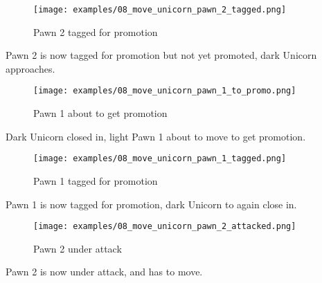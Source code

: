 \clearpage %

\noindent
\begin{figure}[h]
\texttt{[image: examples/08\_move\_unicorn\_pawn\_2\_tagged.png]}
\caption{Pawn 2 tagged for promotion}
\label{fig:08_move_unicorn_pawn_2_tagged}
\end{figure}

Pawn 2 is now tagged for promotion but not yet promoted, dark Unicorn approaches.

\clearpage %

\noindent
\begin{figure}[h]
\texttt{[image: examples/08\_move\_unicorn\_pawn\_1\_to\_promo.png]}
\caption{Pawn 1 about to get promotion}
\label{fig:08_move_unicorn_pawn_1_to_promo}
\end{figure}

Dark Unicorn closed in, light Pawn 1 about to move to get promotion.

\clearpage %

\noindent
\begin{figure}[h]
\texttt{[image: examples/08\_move\_unicorn\_pawn\_1\_tagged.png]}
\caption{Pawn 1 tagged for promotion}
\label{fig:08_move_unicorn_pawn_1_tagged}
\end{figure}

Pawn 1 is now tagged for promotion, dark Unicorn to again close in.

\clearpage %

\noindent
\begin{figure}[h]
\texttt{[image: examples/08\_move\_unicorn\_pawn\_2\_attacked.png]}
\caption{Pawn 2 under attack}
\label{fig:08_move_unicorn_pawn_2_attacked}
\end{figure}

Pawn 2 is now under attack, and has to move.

\clearpage %

